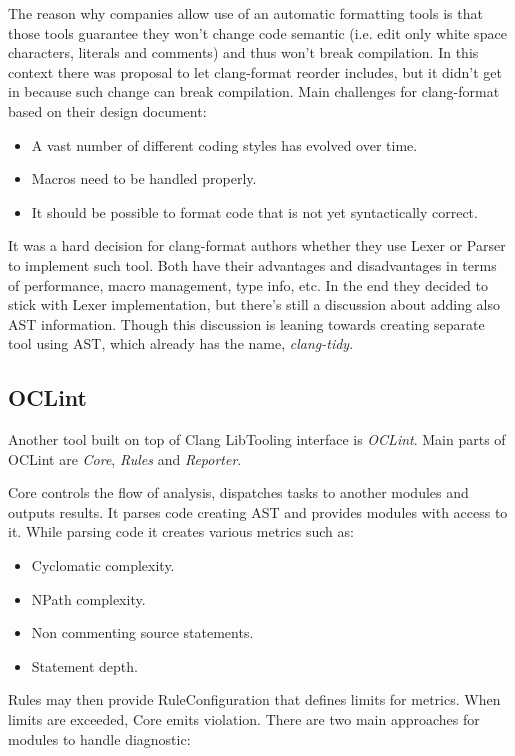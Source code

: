 The reason why companies allow use of an automatic formatting tools is that those tools guarantee they won't change code semantic (i.e. edit only white space characters, literals and comments) and thus won't break compilation. In this context there was proposal to let clang-format reorder includes, but it didn't get in because such change can break compilation. Main challenges for clang-format based on their design document:

\begin{itemize}
\item A vast number of different coding styles has evolved over time.
\item Macros need to be handled properly.
\item It should be possible to format code that is not yet syntactically correct.
\end{itemize}

It was a hard decision for clang-format authors whether they use Lexer or Parser to implement such tool. Both have their advantages and disadvantages in terms of performance, macro management, type info, etc. In the end they decided to stick with Lexer implementation, but there's still a discussion about adding also AST information. Though this discussion is leaning towards creating separate tool using AST, which already has the name, \emph{clang-tidy}.

\subsection{OCLint}
Another tool built on top of Clang LibTooling interface is \emph{OCLint}. Main parts of OCLint are \emph{Core}, \emph{Rules} and \emph{Reporter}.

Core controls the flow of analysis, dispatches tasks to another modules and outputs results. It parses code creating AST and provides modules with access to it. While parsing code it creates various metrics such as:

\begin{itemize}
\item Cyclomatic complexity.
\item NPath complexity.
\item Non commenting source statements.
\item Statement depth.
\end{itemize}

Rules may then provide RuleConfiguration that defines limits for metrics. When limits  are exceeded, Core emits violation. There are two main approaches for modules to handle diagnostic:


